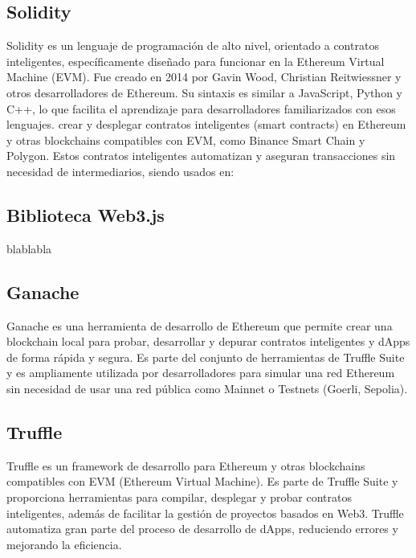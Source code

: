 \subsection{Solidity}

Solidity \cite{solidity} es un lenguaje de programación de alto nivel, orientado a contratos inteligentes, específicamente diseñado para funcionar en la Ethereum Virtual Machine (EVM). Fue creado en 2014 por Gavin Wood, Christian Reitwiessner y otros desarrolladores de Ethereum. Su sintaxis es similar a JavaScript, Python y C++, lo que facilita el aprendizaje para desarrolladores familiarizados con esos lenguajes. crear y desplegar contratos inteligentes (smart contracts) en Ethereum y otras blockchains compatibles con EVM, como Binance Smart Chain y Polygon. Estos contratos inteligentes automatizan y aseguran transacciones sin necesidad de intermediarios, siendo usados en:


\subsection{Biblioteca Web3.js}

blablabla


\subsection{Ganache}

Ganache \cite{ganache_website} es una herramienta de desarrollo de Ethereum que permite crear una blockchain local para probar, desarrollar y depurar contratos inteligentes y dApps de forma rápida y segura. Es parte del conjunto de herramientas de Truffle Suite y es ampliamente utilizada por desarrolladores para simular una red Ethereum sin necesidad de usar una red pública como Mainnet o Testnets (Goerli, Sepolia).


\subsection{Truffle}

Truffle \cite{truffle_website} es un framework de desarrollo para Ethereum y otras blockchains compatibles con EVM (Ethereum Virtual Machine). Es parte de Truffle Suite y proporciona herramientas para compilar, desplegar y probar contratos inteligentes, además de facilitar la gestión de proyectos basados en Web3. Truffle automatiza gran parte del proceso de desarrollo de dApps, reduciendo errores y mejorando la eficiencia.

